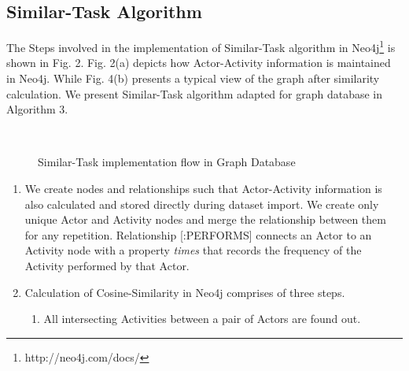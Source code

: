 \documentclass[11pt]{article}
\begin{document}
{{\subsection{Similar-Task Algorithm}
\par{The Steps involved in the implementation of Similar-Task algorithm in Neo4j\footnote{http://neo4j.com/docs/} is shown in Fig. 2. Fig. 2(a) depicts how Actor-Activity information is maintained in Neo4j. While Fig. 4(b) presents a typical view of the graph after similarity calculation. We present Similar-Task algorithm adapted for graph database in Algorithm 3.}
\begin{figure}
  \centering
  \mbox{
    \quad
  }
  \caption{Similar-Task implementation flow in Graph Database}
\end{figure}
\par{\begin{enumerate}[nolistsep]
\item We create nodes and relationships such that Actor-Activity information is also calculated and stored directly during dataset import. We create only unique Actor and Activity nodes and merge the relationship between them for any repetition. Relationship [:PERFORMS] connects an Actor to an Activity node with a property \textit{times} that records the frequency of the Activity performed by that Actor.
\item Calculation of Cosine-Similarity in Neo4j comprises of three steps.
\begin{enumerate}
\item All intersecting Activities between a pair of Actors are found out. 

\end{enumerate}
\end{enumerate}}}}
\end{document}

